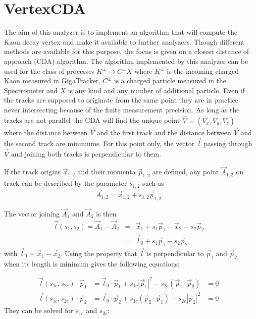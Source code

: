 \section{VertexCDA}

\newcommand{\p}[1]{\vec{p}_{#1}}
\newcommand{\ap}[1]{|\vec{p}_{#1}|^2}
\newcommand{\lv}{\vec{l}}
\newcommand{\lz}{\vec{l}_{0}}
\newcommand{\C}[1]{\vec{A}_{#1}}
\newcommand{\x}[1]{\vec{x}_{#1}}

The aim of this analyzer is to implement an algorithm that will compute the Kaon
decay vertex and make it available to further analyzers. Though different
methods are available for this purpose, the focus is given on a closest distance
of approach (CDA) algorithm. The algorithm implemented by this analyzer can be
used for the class of processes $K^\pm\to C^\pm X$ where $K^\pm$ is the
incoming charged Kaon measured in GigaTracker, $C^\pm$ is a charged particle
measured in the Spectrometer and $X$ is any kind and any number of additional particle. Even if the
tracks are supposed to originate from the same point they are in practice never intersecting
because of the finite measurement precision. As long as the tracks are not parallel the CDA will
find the unique point $\vec{V}=(V_x,V_y,V_z)$ where the distance between $\vec{V}$ and the first
track and the distance between $\vec{V}$ and the second track are minimums. For this point only,
the vector $\lv$ passing through $\vec{V}$ and joining both tracks is perpendicular to
them.

If the track origins $\vec{x}_{1,2}$ and their momenta $\p{1,2}$ are defined, any point $\C{1,2}$
on track can be described by the parameter $s_{1,2}$ such as
\begin{equation}
	\C{1,2} = \x{1,2} + s_{1,2} \p{1,2}
\end{equation}

The vector joining $\C{1}$ and $\C{2}$ is then
\begin{eqnarray}
	\lv(s_1,s_2)=\C{1}-\C{2} &=& \x{1}+s_1\p{1} - \x{2} - s_2\p{2}\\
	&=& \lz + s_1\p{1} - s_2\p{2}
\end{eqnarray}
with $\lz = \x{1}-\x{2}$. Using the property that $\lv$ is perpendicular to
$\p{1}$ and $\p{2}$ when its length is minimum gives the following
equations:

\begin{align}
	\lv(s_{1c},s_{2c})\cdot\p{1} &= \lz\cdot\p{1} + s_{1c}\ap{1} -
	s_{2c}(\p{1}\cdot\p{2}) &= 0
	\\
	\lv(s_{1c},s_{2c})\cdot\p{2} &= \lz\cdot\p{2} + s_{1c}(\p{2}\cdot\p{1}) -
	s_{2c}\ap{2} &= 0
\end{align}
They can be solved for $s_{1c}$ and $s_{2c}$:

